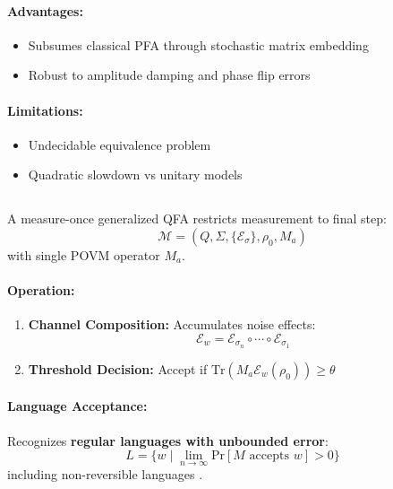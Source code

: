 \paragraph{Advantages:}
\begin{itemize}
    \item Subsumes classical PFA through stochastic matrix embedding
    \item Robust to amplitude damping and phase flip errors
\end{itemize}

\paragraph{Limitations:}
\begin{itemize}
    \item Undecidable equivalence problem \cite{blondel2003equivalence}
    \item Quadratic slowdown vs unitary models
\end{itemize}

\subsection{}
\label{subsec:mo-1gqfa}

\begin{definition}
A measure-once generalized QFA restricts measurement to final step:
\[
\mathcal{M} = (Q, \Sigma, \{\mathcal{E}_\sigma\}, \rho_0, M_a)
\]
with single POVM operator $M_a$.
\end{definition}

\paragraph{Operation:}
\begin{enumerate}
    \item \textbf{Channel Composition:} Accumulates noise effects:
    \[
    \mathcal{E}_w = \mathcal{E}_{\sigma_n} \circ \cdots \circ \mathcal{E}_{\sigma_1}
    \]
    \item \textbf{Threshold Decision:} Accept if $\text{Tr}(M_a\mathcal{E}_w(\rho_0)) \geq \theta$
\end{enumerate}

\paragraph{Language Acceptance:}
Recognizes \textbf{regular languages with unbounded error}:
\[
L = \{w \mid \lim_{n\to\infty} \text{Pr}[M \text{ accepts } w] > 0\}
\]
including non-reversible languages \cite{hirvensalo2012quantum}.

